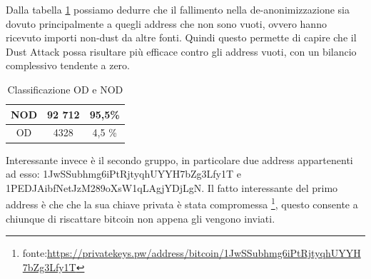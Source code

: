 Dalla tabella \ref{tab:OD_NOD_failed} possiamo dedurre che il fallimento nella de-anonimizzazione sia dovuto principalmente a quegli address che non sono vuoti, ovvero hanno ricevuto importi non-dust da altre fonti. Quindi questo permette di capire che il Dust Attack possa risultare più efficace contro gli address vuoti, con un bilancio complessivo tendente a zero.
\begin{table}[H]
    \centering
    \begin{tabular}{|c|c|c|}
        \hline
            NOD  & 92 712 & 95,5\%\\
        \hline 
            OD  & 4328 & 4,5 \%\\
        \hline
    \end{tabular}
    \caption{Classificazione OD e NOD}
    \label{tab:OD_NOD_failed}
\end{table}
Interessante invece è il secondo gruppo, in particolare due address appartenenti ad esso: 1JwSSubhmg6iPtRjtyqhUYYH7bZg3Lfy1T e 1PEDJAibfNetJzM289oXsW1qLAgjYDjLgN. Il fatto interessante del primo address è che che la sua chiave privata è stata compromessa \footnote{fonte:\url{https://privatekeys.pw/address/bitcoin/1JwSSubhmg6iPtRjtyqhUYYH7bZg3Lfy1T}}, questo consente a chiunque di riscattare bitcoin non appena gli vengono inviati.


